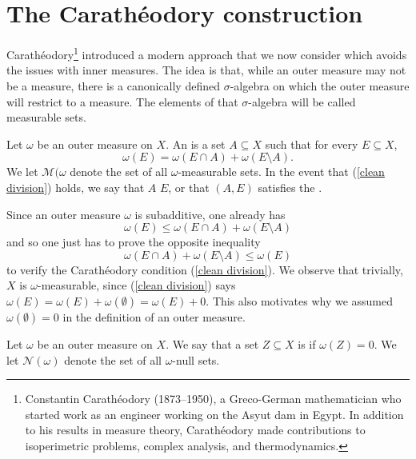 \section{The Carathéodory construction}
Carathéodory\footnote{Constantin Carathéodory (1873--1950), a Greco-German mathematician who started work as an engineer working on the Asyut dam in Egypt. In addition to his results in measure theory, Carathéodory made contributions to isoperimetric problems, complex analysis, and thermodynamics.} introduced a modern approach that we now consider which avoids the issues with inner measures.
The idea is that, while an outer measure may not be a measure, there is a canonically defined $\sigma$-algebra on which the outer measure will restrict to a measure.
The elements of that $\sigma$-algebra will be called measurable sets.

\begin{definition}
Let $\omega$ be an outer measure on $X$.
An  is a set $A \subseteq X$ such that for every $E \subseteq X$,
\begin{equation}\label{clean division}
\omega(E) = \omega(E \cap A) + \omega(E \setminus A).
\end{equation}
We let $\mathcal M(\omega$ denote the set of all $\omega$-measurable sets.
In the event that (\ref{clean division}) holds, we say that $A$  $E$, or that $(A, E)$ satisfies the .
\end{definition}

\begin{subsec}
Since an outer measure $\omega$ is subadditive, one already has
\[\omega(E) \leq \omega(E \cap A) + \omega(E \setminus A)\]
and so one just has to prove the opposite inequality
\begin{equation}\label{Caratheodory inequality}
\omega(E \cap A) + \omega(E \setminus A) \leq \omega(E)
\end{equation}
to verify the Carathéodory condition (\ref{clean division}).
We observe that trivially, $X$ is $\omega$-measurable, since (\ref{clean division}) says $\omega(E) = \omega(E) + \omega(\emptyset) = \omega(E) + 0$.
This also motivates why we assumed $\omega(\emptyset) = 0$ in the definition of an outer measure.
\end{subsec}

\begin{definition}
Let $\omega$ be an outer measure on $X$.
We say that a set $Z \subseteq X$ is  if $\omega(Z) = 0$.
We let $\mathcal N(\omega)$ denote the set of all $\omega$-null sets.
\end{definition}

